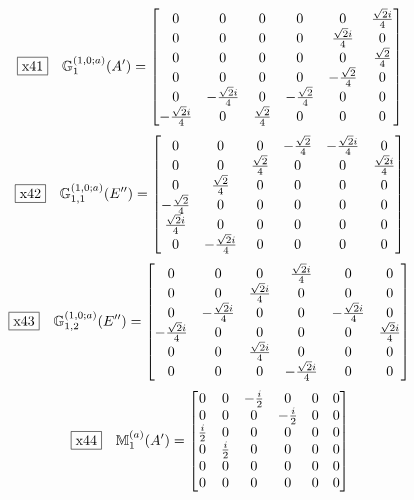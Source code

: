 \documentclass[fleqn,10pt,landscape]{jsarticle}
\begin{document}
\begin{dmath*}
\fbox{x41}\quad \mathbb{G}_{1}^{(1,0;a)}(A^{\prime})=\begin{bmatrix} 0 & 0 & 0 & 0 & 0 & \frac{\sqrt{2} i}{4} \\ 0 & 0 & 0 & 0 & \frac{\sqrt{2} i}{4} & 0 \\ 0 & 0 & 0 & 0 & 0 & \frac{\sqrt{2}}{4} \\ 0 & 0 & 0 & 0 & - \frac{\sqrt{2}}{4} & 0 \\ 0 & - \frac{\sqrt{2} i}{4} & 0 & - \frac{\sqrt{2}}{4} & 0 & 0 \\ - \frac{\sqrt{2} i}{4} & 0 & \frac{\sqrt{2}}{4} & 0 & 0 & 0 \end{bmatrix}
\end{dmath*}
\begin{dmath*}
\fbox{x42}\quad \mathbb{G}_{1,1}^{(1,0;a)}(E^{\prime\prime})=\begin{bmatrix} 0 & 0 & 0 & - \frac{\sqrt{2}}{4} & - \frac{\sqrt{2} i}{4} & 0 \\ 0 & 0 & \frac{\sqrt{2}}{4} & 0 & 0 & \frac{\sqrt{2} i}{4} \\ 0 & \frac{\sqrt{2}}{4} & 0 & 0 & 0 & 0 \\ - \frac{\sqrt{2}}{4} & 0 & 0 & 0 & 0 & 0 \\ \frac{\sqrt{2} i}{4} & 0 & 0 & 0 & 0 & 0 \\ 0 & - \frac{\sqrt{2} i}{4} & 0 & 0 & 0 & 0 \end{bmatrix}
\end{dmath*}
\begin{dmath*}
\fbox{x43}\quad \mathbb{G}_{1,2}^{(1,0;a)}(E^{\prime\prime})=\begin{bmatrix} 0 & 0 & 0 & \frac{\sqrt{2} i}{4} & 0 & 0 \\ 0 & 0 & \frac{\sqrt{2} i}{4} & 0 & 0 & 0 \\ 0 & - \frac{\sqrt{2} i}{4} & 0 & 0 & - \frac{\sqrt{2} i}{4} & 0 \\ - \frac{\sqrt{2} i}{4} & 0 & 0 & 0 & 0 & \frac{\sqrt{2} i}{4} \\ 0 & 0 & \frac{\sqrt{2} i}{4} & 0 & 0 & 0 \\ 0 & 0 & 0 & - \frac{\sqrt{2} i}{4} & 0 & 0 \end{bmatrix}
\end{dmath*}
\begin{dmath*}
\fbox{x44}\quad \mathbb{M}_{1}^{(a)}(A^{\prime})=\begin{bmatrix} 0 & 0 & - \frac{i}{2} & 0 & 0 & 0 \\ 0 & 0 & 0 & - \frac{i}{2} & 0 & 0 \\ \frac{i}{2} & 0 & 0 & 0 & 0 & 0 \\ 0 & \frac{i}{2} & 0 & 0 & 0 & 0 \\ 0 & 0 & 0 & 0 & 0 & 0 \\ 0 & 0 & 0 & 0 & 0 & 0 \end{bmatrix}
\end{dmath*}
\end{document}
